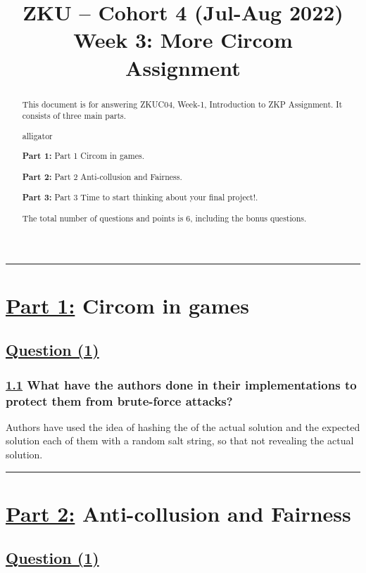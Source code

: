 \documentclass[letterpaper, 10 pt, conference]{ieeeconf}  %
\title{\LARGE \bf
ZKU – Cohort 4 (Jul-Aug 2022)\\Week 3: More Circom\\Assignment \sharp 3}
\author{Iskander Andrews$^{1}$%
\thanks{\noindent\rule{3cm}{0.4pt}}
\thanks{\faIcon{discord} \tt\small Isk#0996}
\thanks{\faIcon{twitter} \tt\small \href{https://twitter.com/iskdrews}{twitter.com/iskdrews}}
\thanks{\faIcon{github} \tt\small \href{https://github.com/iskdrews}{github.com/iskdrews}}
\thanks{\faIcon{linkedin} \tt\small \href{https://www.linkedin.com/in/iskander-andrews-99638313a/}{in/iskander-andrews}}
\thanks{\faIcon[regular]{envelope} \tt\small iskander.s.andrews@gmail.com}
}
\begin{document}
\maketitle
\thispagestyle{empty}
\pagestyle{empty}


\begin{abstract}

This document is for answering ZKUC04, Week-1, Introduction to ZKP Assignment.
It consists of three main parts.
\begin{labeling}{alligator}
\item [\textbf{Part 1:}] Part 1 Circom in games.
\item [\textbf{Part 2:}] Part 2 Anti-collusion and Fairness.
\item [\textbf{Part 3:}] Part 3 Time to start thinking about your final project!.
\end{labeling}

The total number of questions and points is $6$, including the bonus questions. 
\end{abstract}

\noindent\rule{8cm}{0.4pt}

\section{\textbf{\underline{Part 1:}} Circom in games}
\subsection{\textbf{\underline{Question (1)}}}
\subsubsection{\textbf{\underline{1.1}  What have the authors done in their implementations to protect them from brute-force attacks?}}

Authors have used the idea of hashing the of the actual solution and the expected solution each of them with a random salt string, so that not revealing the actual solution.  

\noindent\rule{8cm}{0.4pt}

\section{\textbf{\underline{Part 2:}} Anti-collusion and Fairness}
\subsection{\textbf{\underline{Question (1)}}}
\end{document}
